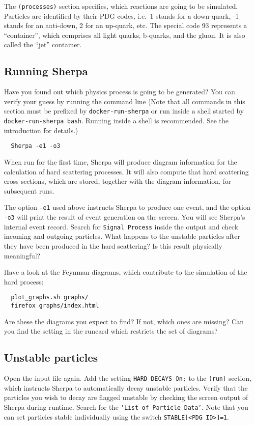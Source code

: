 \documentclass[10pt]{article}
\begin{document}
The {\tt(processes)} section specifies, which reactions are going to be simulated.
Particles are identified by their PDG codes, i.e.\ 1 stands for a down-quark, 
-1 stands for an anti-down, 2 for an up-quark, etc. 
The special code 93 represents a ``container'', which comprises all light quarks,
b-quarks, and the gluon. It is also called the ``jet'' container.

\subsection{Running Sherpa}
\label{sec:running_sherpa}

Have you found out which physics process is going to be generated?
You can verify your guess by running the command line (Note that all commands
in this section must be prefixed by {\tt docker-run-sherpa} or run inside a shell
started by {\tt docker-run-sherpa bash}. Running inside a shell is recommended.
See the introduction for details.)
\begin{verbatim}
  Sherpa -e1 -o3
\end{verbatim}
When run for the first time, Sherpa will produce diagram information for the calculation
of hard scattering processes. It will also compute that hard scattering cross sections,
which are stored, together with the diagram information, for subsequent runs.

The option {\tt -e1} used above instructs Sherpa to produce one event, and the option 
{\tt -o3} will print the result of event generation on the screen. You will see Sherpa's 
internal event record. Search for {\tt Signal Process} inside the output and check 
incoming and outgoing particles.
What happens to the unstable particles after they have been produced in the hard 
scattering? Is this result physically meaningful?

Have a look at the Feynman diagrams, which contribute to the simulation of the hard process:
\begin{verbatim}
  plot_graphs.sh graphs/
  firefox graphs/index.html
\end{verbatim}
Are these the diagrams you expect to find? If not, which ones are missing?
Can you find the setting in the runcard which restricts the set of diagrams?

\subsection{Unstable particles}

Open the input file again. Add the setting {\tt HARD\_DECAYS On;}
to the {\tt(run)} section, which instructs Sherpa to automatically 
decay unstable particles. Verify that the particles you wish to decay are
flagged unstable by checking the screen output of Sherpa during runtime. 
Search for the {\tt `List of Particle Data'}. Note that you can set particles
stable individually using the switch {\tt STABLE[<PDG ID>]=1}.
\end{document}

